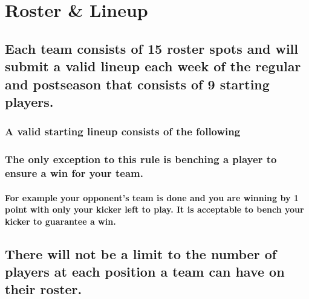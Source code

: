 \documentclass[
]{book}
\begin{document}
\hypertarget{roster-lineup}{%
\section{Roster \& Lineup}\label{roster-lineup}}

\hypertarget{each-team-consists-of-15-roster-spots-and-will-submit-a-valid-lineup-each-week-of-the-regular-and-postseason-that-consists-of-9-starting-players.}{%
\subsection{Each team consists of 15 roster spots and will submit a valid lineup each week of the regular and postseason that consists of 9 starting players.}\label{each-team-consists-of-15-roster-spots-and-will-submit-a-valid-lineup-each-week-of-the-regular-and-postseason-that-consists-of-9-starting-players.}}

\hypertarget{a-valid-starting-lineup-consists-of-the-following}{%
\subsubsection{A valid starting lineup consists of the following}\label{a-valid-starting-lineup-consists-of-the-following}}

\hypertarget{the-only-exception-to-this-rule-is-benching-a-player-to-ensure-a-win-for-your-team.}{%
\subsubsection{The only exception to this rule is benching a player to ensure a win for your team.}\label{the-only-exception-to-this-rule-is-benching-a-player-to-ensure-a-win-for-your-team.}}

\hypertarget{for-example-your-opponents-team-is-done-and-you-are-winning-by-1-point-with-only-your-kicker-left-to-play.-it-is-acceptable-to-bench-your-kicker-to-guarantee-a-win.}{%
\paragraph{For example your opponent's team is done and you are winning by 1 point with only your kicker left to play. It is acceptable to bench your kicker to guarantee a win.}\label{for-example-your-opponents-team-is-done-and-you-are-winning-by-1-point-with-only-your-kicker-left-to-play.-it-is-acceptable-to-bench-your-kicker-to-guarantee-a-win.}}

\hypertarget{there-will-not-be-a-limit-to-the-number-of-players-at-each-position-a-team-can-have-on-their-roster.}{%
\subsection{There will not be a limit to the number of players at each position a team can have on their roster.}\label{there-will-not-be-a-limit-to-the-number-of-players-at-each-position-a-team-can-have-on-their-roster.}}
\end{document}
